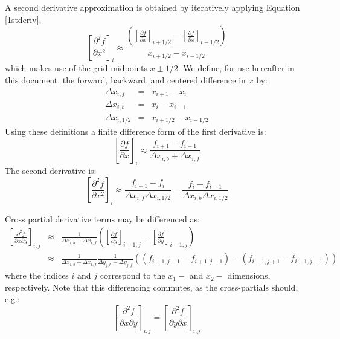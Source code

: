 \documentclass[11pt,letterpaper]{article}
\begin{document}
A second derivative approximation is obtained by iteratively applying Equation \ref{1stderiv}.  
\begin{equation}
\left[ \frac{\partial^2 f}{\partial x^2} \right]_i \approx \frac{\left( \left[ \frac{\partial f}{\partial x} \right]_{i+1/2} - \left[ \frac{\partial f}{\partial x} \right]_{i-1/2} \right)}{x_{i+1/2} - x_{i-1/2}} 
\end{equation}
which makes use of the grid midpoints $x\pm1/2$.  We define, for use hereafter in this document, the forward, backward, and centered difference in $x$ by:
\begin{eqnarray}
\Delta x_{i,f} &=& x_{i+1} - x_i \nonumber \\
\Delta x_{i,b} &=& x_i - x_{i-1} \nonumber \\
\Delta x_{i,1/2} &=& x_{i+1/2} - x_{i-1/2} \nonumber
\end{eqnarray}
Using these definitions a finite difference form of the first derivative is:
\begin{equation}
\left[ \frac{\partial f}{\partial x} \right]_i \approx \frac{f_{i+1} - f_{i-1}}{\Delta x_{i,b}+\Delta x_{i,f}}
\end{equation}
The second derivative is:
\begin{equation}
\left[ \frac{\partial^2 f}{\partial x^2} \right]_i \approx \frac{f_{i+1} - f_i}{\Delta x_{i,f}\Delta x_{i,1/2}} - \frac{f_i - f_{i-1}}{\Delta x_{i,b}\Delta x_{i,1/2}}
\end{equation}

Cross partial derivative terms may be differenced as:
\begin{eqnarray}
\left[ \frac{\partial^2 f}{\partial x \partial y} \right]_{i,j} &\approx& \frac{1}{\Delta x_{i,b} + \Delta x_{i,f}}\left( \left[ \frac{\partial f}{\partial y} \right]_{i+1,j} - \left[ \frac{\partial f}{\partial y} \right]_{i-1,j} \right) \\
 &\approx& \frac{1}{\Delta x_{i,b} + \Delta x_{i,f}} \frac{1}{\Delta y_{j,b} + \Delta y_{j,f}} \left( \left( f_{i+1,j+1} - f_{i+1,j-1} \right) - \left( f_{i-1,j+1} - f_{i-1,j-1} \right) \right)
\end{eqnarray}
where the indices $i$ and $j$ correspond to the $x_1-$ and $x_2-$ dimensions, respectively.  Note that this differencing commutes, as the cross-partials should, e.g.:
\begin{equation}
\left[ \frac{\partial^2 f}{\partial x \partial y} \right]_{i,j} = \left[ \frac{\partial^2 f}{\partial y \partial x} \right]_{i,j}
\end{equation}
\end{document}
